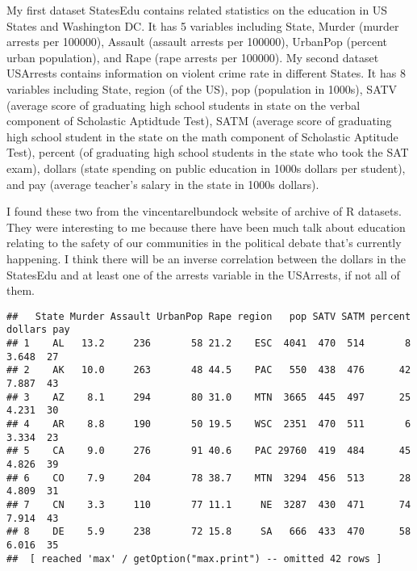 \documentclass[
]{article}
\newenvironment{Shaded}{\begin{snugshade}}{\end{snugshade}}
\newcommand{\CommentTok}[1]{\textcolor[rgb]{0.56,0.35,0.01}{\textit{#1}}}
\newcommand{\DataTypeTok}[1]{\textcolor[rgb]{0.13,0.29,0.53}{#1}}
\newcommand{\KeywordTok}[1]{\textcolor[rgb]{0.13,0.29,0.53}{\textbf{#1}}}
\newcommand{\NormalTok}[1]{#1}
\newcommand{\OperatorTok}[1]{\textcolor[rgb]{0.81,0.36,0.00}{\textbf{#1}}}
\newcommand{\StringTok}[1]{\textcolor[rgb]{0.31,0.60,0.02}{#1}}
\begin{document}
My first dataset StatesEdu contains related statistics on the education
in US States and Washington DC. It has 5 variables including State,
Murder (murder arrests per 100000), Assault (assault arrests per
100000), UrbanPop (percent urban population), and Rape (rape arrests per
100000). My second dataset USArrests contains information on violent
crime rate in different States. It has 8 variables including State,
region (of the US), pop (population in 1000s), SATV (average score of
graduating high school students in state on the verbal component of
Scholastic Aptidtude Test), SATM (average score of graduating high
school student in the state on the math component of Scholastic Aptitude
Test), percent (of graduating high school students in the state who took
the SAT exam), dollars (state spending on public education in 1000s
dollars per student), and pay (average teacher's salary in the state in
1000s dollars).

I found these two from the vincentarelbundock website of archive of R
datasets. They were interesting to me because there have been much talk
about education relating to the safety of our communities in the
political debate that's currently happening. I think there will be an
inverse correlation between the dollars in the StatesEdu and at least
one of the arrests variable in the USArrests, if not all of them.

\begin{Shaded}
\end{Shaded}

\begin{verbatim}
##   State Murder Assault UrbanPop Rape region   pop SATV SATM percent dollars pay
## 1    AL   13.2     236       58 21.2    ESC  4041  470  514       8   3.648  27
## 2    AK   10.0     263       48 44.5    PAC   550  438  476      42   7.887  43
## 3    AZ    8.1     294       80 31.0    MTN  3665  445  497      25   4.231  30
## 4    AR    8.8     190       50 19.5    WSC  2351  470  511       6   3.334  23
## 5    CA    9.0     276       91 40.6    PAC 29760  419  484      45   4.826  39
## 6    CO    7.9     204       78 38.7    MTN  3294  456  513      28   4.809  31
## 7    CN    3.3     110       77 11.1     NE  3287  430  471      74   7.914  43
## 8    DE    5.9     238       72 15.8     SA   666  433  470      58   6.016  35
##  [ reached 'max' / getOption("max.print") -- omitted 42 rows ]
\end{verbatim}
\end{document}
